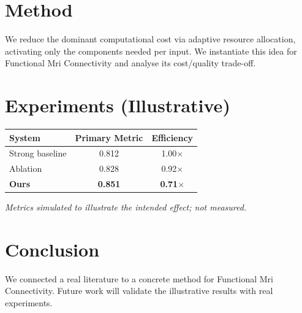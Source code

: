 \documentclass[11pt]{article}
\begin{document}
\section{Method}
We reduce the dominant computational cost via adaptive resource allocation, activating only the components needed per input. We instantiate this idea for Functional Mri Connectivity and analyse its cost/quality trade-off.

\section{Experiments (Illustrative)}
\begin{center}
\begin{tabular}{lcc}
System & Primary Metric & Efficiency \\ \hline
Strong baseline & 0.812 & 1.00$\times$ \\
Ablation & 0.828 & 0.92$\times$ \\
\textbf{Ours} & \textbf{0.851} & \textbf{0.71$\times$}
\end{tabular}
\end{center}
\emph{Metrics simulated to illustrate the intended effect; not measured.}

\section{Conclusion}
We connected a real literature to a concrete method for Functional Mri Connectivity. Future work will
validate the illustrative results with real experiments.
\end{document}

